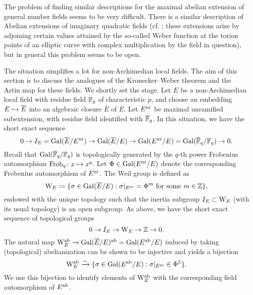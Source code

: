 \documentclass[../main.tex]{subfiles}
\begin{document}
The problem of finding similar descriptions for the maximal abelian extension of
general number fields seems to be very difficult. There is a similar description 
of Abelian extensions of imaginary quadratic fields (cf. \cite[Chapter II,
§5]{silverman1994advanced}; these extensions arise by adjoining certain values attained
by the so-called Weber function at the torion points of an elliptic curve with complex
multiplication by the field in question), but in general this problem seems to be open.

The situation simplifies a lot for non-Archimedian local fields. 
The aim of this section is to discuss the analogues of the 
Kronecker--Weber theorem and the Artin map for these fields. We shortly set the
stage. Let $E$ be a non-Archimedian local field with residue field $\mathbb{F}_q$ of
characteristic $p$, and choose an embedding $E \hookrightarrow \overline E$ into an algebraic
closure $\bar E$ of $E$. Let $E^{\mathrm{nr}}$ be maximal unramified subextension, with
residue field identified with ${\overline {\mathbb{F}}_q}$.
In this situation, we have the short exact sequence
\begin{equation*}
  0 \to I_E = \operatorname{Gal}(\overline E/ E^{\mathrm{nr}}) \to \operatorname{Gal}(\overline E/E) \to \operatorname{Gal}(E^{\mathrm{nr}} /E) =
  \operatorname{Gal}(\overline {\mathbb{F}}_q /\mathbb{F}_q) \to 0.
\end{equation*}
Recall that $\operatorname{Gal}({\overline {\mathbb{F}}_q}/\mathbb{F}_q)$ is topologically generated by the $q$-th power
Frobenius automorphism $\mathrm{Frob}_q\colon x \mapsto x^q$. Let $\Phi \in \operatorname{Gal}(E^{\mathrm{nr}} /E)$ 
denote the corresponding Frobenius automorphism of $E^{\mathrm{nr}}$. 
The Weil group is defined as
\begin{equation*}
  \mathrm W_E \coloneq \{\sigma \in \operatorname{Gal}(\overline E/E) : \sigma|_{E^{\mathrm{nr}}} = \Phi^m
  \text{ for some } m \in \mathbb{Z}\},
\end{equation*}
endowed with the unique topology such that the inertia subgroup $I_E \subset
\mathrm W_E$ (with its usual topology) is an open subgroup.
As above, we have the short exact sequence of topological groups
\begin{equation*}
  0 \to I_E \to \mathrm W_E \to \mathbb{Z} \to 0.
\end{equation*}
The natural map $\mathrm W_E^{\mathrm{ab}} \to \operatorname{Gal}(\overline E/E)^{\mathrm{ab}} = \operatorname{Gal}(E^{\mathrm{ab}}/E)$ induced by taking
(topological) abelianization can be shown to be injective and yields a bijection
\begin{equation}\label{eq:WeilgroupInjectsIntoGalois}
  \mathrm W_E^{\mathrm{ab}} \xrightarrow{\sim} \{\sigma \in \operatorname{Gal}(E^{\mathrm{ab}}/E) : \sigma|_{E^{\mathrm{nr}}} \in \Phi^{\mathbb{Z}}\}.
\end{equation}
We use this bijection to identify elements of $\mathrm W_E^{\mathrm{ab}}$ with the corresponding field
automorphism of $E^{\mathrm{ab}}$. 
\end{document}
